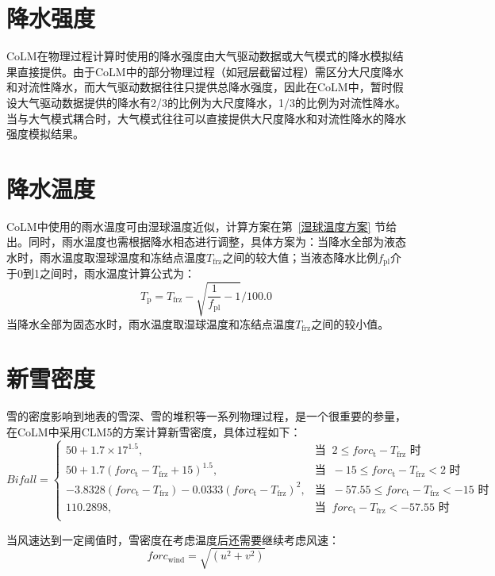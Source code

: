 \section{降水强度}
CoLM在物理过程计算时使用的降水强度由大气驱动数据或大气模式的降水模拟结果直接提供。由于CoLM中的部分物理过程（如冠层截留过程）需区分大尺度降水和对流性降水，而大气驱动数据往往只提供总降水强度，因此在CoLM中，暂时假设大气驱动数据提供的降水有2/3的比例为大尺度降水，1/3的比例为对流性降水。当与大气模式耦合时，大气模式往往可以直接提供大尺度降水和对流性降水的降水强度模拟结果。


\section{降水温度}
CoLM中使用的雨水温度可由湿球温度近似，计算方案在第~\ref{湿球温度方案} 节给出。同时，雨水温度也需根据降水相态进行调整，具体方案为：当降水全部为液态水时，雨水温度取湿球温度和冻结点温度$T_{\mathrm{frz}}$之间的较大值；当液态降水比例$f_{\mathrm{pl}}$介于0到1之间时，雨水温度计算公式为：$$T_{\mathrm {p}}=T_{\mathrm{frz}}-\sqrt{\frac{1}{f_{\mathrm{pl}}}-1}/100.0$$
当降水全部为固态水时，雨水温度取湿球温度和冻结点温度$T_{\mathrm{frz}}$之间的较小值。


\section{新雪密度}
雪的密度影响到地表的雪深、雪的堆积等一系列物理过程，是一个很重要的参量，在CoLM中采用CLM5的方案计算新雪密度，具体过程如下：
\begin{equation*}
  Bifall= \begin{cases}
    50 + 1.7\times 17^{1.5}, & \text{当 }\ 2\leqslant forc_{\mathrm {t}} - T_{\mathrm{frz}} \text{ 时}\\
    50 + 1.7(forc_{\mathrm {t}} - T_{\mathrm{frz}}+15)^{1.5}, & \text{当 }\ -15\leqslant forc_{\mathrm {t}} - T_{\mathrm{frz}} < 2 \text{ 时} \\
    -3.8328(forc_{\mathrm {t}} - T_{\mathrm{frz}}) - 0.0333(forc_{\mathrm {t}} - T_{\mathrm{frz}})^2, & \text{当 }\ -57.55\leqslant forc_{\mathrm {t}} - T_{\mathrm{frz}} < -15 \text{ 时} \\
    110.2898, & \text{当 }\ forc_{\mathrm {t}} - T_{\mathrm{frz}} < -57.55 \text{ 时}\\
  \end{cases}
\end{equation*}

当风速达到一定阈值时，雪密度在考虑温度后还需要继续考虑风速：
\begin{equation}
  forc_{\mathrm{wind}} = \sqrt{(u^2 + v^2)}
\end{equation}


